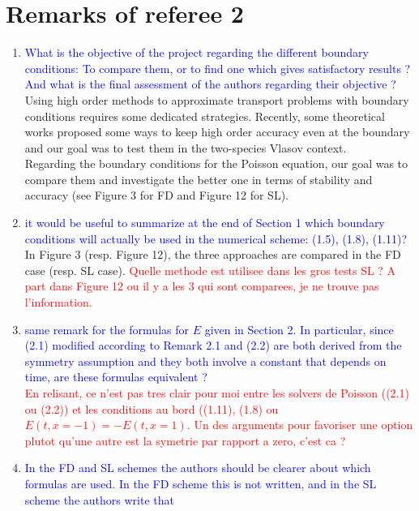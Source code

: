\documentclass{article}
\begin{document}
\bigskip 

\section{Remarks of referee 2}

\begin{enumerate}
    \item \textcolor{blue}{What is the objective of the project regarding the different boundary conditions:
To compare them, or to find one which gives satisfactory results ?
And what is the final assessment of the authors regarding their objective ? }\\ 
Using high order methods to approximate transport problems with boundary conditions requires some dedicated strategies. 
Recently, some theoretical works proposed some ways to keep high order accuracy even at the boundary and our goal 
was to test them in the two-species Vlasov context. \\
Regarding the boundary conditions for the Poisson equation, our goal was to compare them and investigate the better one 
in terms of stability and accuracy (see Figure 3 for FD and Figure 12 for SL). 
        \item \textcolor{blue}{it would be useful to summarize at the end of Section 1 which boundary conditions will actually be used in the numerical scheme: (1.5), (1.8), (1.11)? }\\
    In Figure 3 (resp. Figure 12), the three approaches are compared in the FD case (resp. SL case).     \textcolor{red}{Quelle methode est utilisee dans les gros tests SL ?  A part dans Figure 12 ou il y a les 3 qui sont comparees, je ne trouve pas l'information. }
    \item \textcolor{blue}{same remark for the formulas for $E$ given in Section 2. In particular,
since (2.1) modified according to Remark 2.1 and (2.2) are both derived from the symmetry assumption and they both involve a constant that depends on time, are these formulas equivalent ?} \\ 
\textcolor{red}{En relisant, ce n'est pas tres clair pour moi entre les solvers de Poisson ((2.1) ou (2.2)) et les conditions au bord 
((1.11), (1.8) ou $E(t, x=-1)=-E(t, x=1)$. Un des arguments pour favoriser une option plutot qu'une autre est la symetrie par rapport a zero, c'est ca ?   }
    \item \textcolor{blue}{In the FD and SL schemes the authors should be clearer about which formulas are used.
In the FD scheme this is not written, and in the SL scheme the authors write that
}
\end{enumerate}
\end{document}
